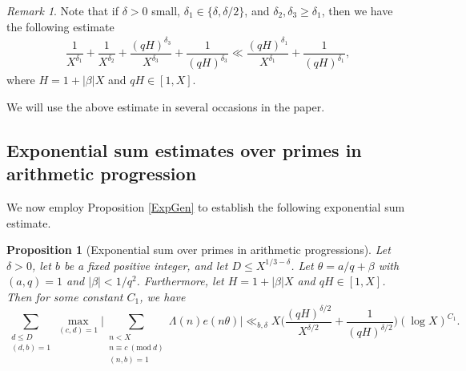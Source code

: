 \documentclass[12pt]{amsart}
\numberwithin{equation}{section}
\newtheorem{prop}[theorem]{Proposition}
\theoremstyle{remark}
\newtheorem{rem}{Remark}[section]
\theoremstyle{definition}
\newcommand{\imod}[1]{\ (\mathrm{mod}\ #1)}
\begin{document}
\begin{rem}\label{Delta Remark}
Note that if $\delta>0$ small, $\delta_1\in \{\delta, \delta/2\}$, and $\delta_2, \delta_3\geq \delta_1$, then we have the following estimate
\begin{align}\label{Delta remark eq 1}
\dfrac{1}{X^{\delta_1}} + \dfrac{1}{X^{\delta_2}} + \dfrac{(qH)^{\delta_3}}{X^{\delta_3}} + \dfrac{1}{(qH)^{\delta_3}} \ll \dfrac{(qH)^{\delta_1}}{X^{\delta_1}} + \dfrac{1}{(qH)^{\delta_1}},
\end{align}
where $H=1+|\beta|X$ and $qH\in [1, X]$.

We will use the above estimate in several occasions in the paper.
\end{rem}





\subsection{Exponential sum estimates over primes in arithmetic progression}
We now employ Proposition \ref{ExpGen} to establish the following exponential sum estimate.

\begin{prop}[Exponential sum over primes in arithmetic progressions]\label{PropminorPrimeI}
Let $\delta>0$, let $b$ be a fixed positive integer, and let $D\leq X^{1/3-\delta}$. Let $\theta= a/q + \beta$ with $(a, q)=1$ and $\lvert \beta\rvert <1/q^2$. Furthermore, let $H=1+|\beta|X$ and $qH\in [1, X]$. Then for some constant $C_1$, we have 
\begin{equation}
\sum_{\substack{d\leq D\\(d,b)=1}}\max_{(c,d)=1}\bigg\lvert\sum_{\substack{n<X\\n \equiv c \imod d\\(n, b)=1}}\Lambda(n)e(n\theta)\bigg\rvert \ll_{b, \delta} X\bigg(\dfrac{(qH)^{\delta/2}}{X^{\delta/2}} + \dfrac{1}{(qH)^{\delta/2}}\bigg)(\log X)^{C_1}.
\end{equation}
\end{prop}
\end{document}
